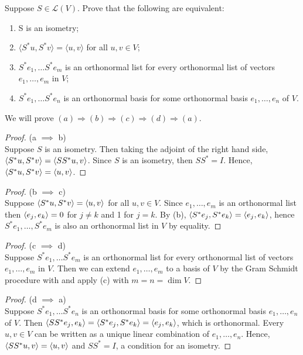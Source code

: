 Suppose $S \in \mathcal{L}(V)$. Prove that the following are equivalent:
\begin{enumerate}
    \item S is an isometry;
    \item $\langle S^*u , S^*v \rangle = \langle u , v \rangle$ for all $u, v \in V$;
    \item $S^*e_1 , \ldots S^*e_m$ is an orthonormal list for every orthonormal list of vectors $e_1 , \ldots , e_m$ in $V$;
    \item $S^*e_1 , \ldots S^*e_n$ is an orthonormal basis for some orthonormal basis $e_1 , \ldots , e_n$ of $V$.
    \end{enumerate}
    
    \nl We will prove $(a) \Rightarrow (b) \Rightarrow (c) \Rightarrow (d) \Rightarrow (a)$.
\begin{proof} (a $\implies$ b)\\
   Suppose $S$ is an isometry. Then taking the adjoint of the right hand side, $\inner{S^*u, S^*v} = \inner{SS^*u, v}$. Since $S$ is an isometry, then $SS^* = I$. Hence, $\inner{S^*u, S^*v} = \inner{u,v}$.
\end{proof}
\begin{proof} (b $\implies$ c)\\
    Suppose $\inner{S^*u, S^*v} = \inner{u,v}$ for all $u,v \in V$. Since $e_1, \dots, e_m$ is an orthonormal list then $\inner{e_j, e_k} = 0$ for $j \neq k$ and 1 for $j = k$. By (b), $\inner{S^*e_j, S^*e_k} = \inner{e_j, e_k}$, hence $S^*e_1, \dots, S^*e_m$ is also an orthonormal list in $V$ by equality.
\end{proof}
\begin{proof} (c $\implies$ d)\\
    Suppose $S^*e_1 , \ldots S^*e_m$ is an orthonormal list for every orthonormal list of vectors $e_1 , \ldots , e_m$ in $V$. Then we can extend $e_1, \dots, e_m$ to a basis of $V$ by the Gram Schmidt procedure with and apply (c) with $m = n = \dim V$.
\end{proof}
\begin{proof} (d $\implies$ a)\\
    Suppose $S^*e_1 , \ldots S^*e_n$ is an orthonormal basis for some orthonormal basis $e_1 , \ldots , e_n$ of $V$. Then $\inner{SS^*e_j, e_k} = \inner{S^*e_j, S^*e_k} = \inner{e_j, e_k}$, which is orthonormal. Every $u, v \in V$ can be written as a unique linear combination of $e_1, \dots, e_n$. Hence, $\inner{SS^*u, v} = \inner{u,v}$ and $SS^* = I$, a condition for an isometry.
\end{proof}